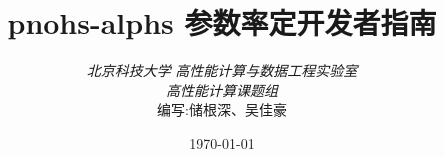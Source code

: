 \begin{titlepage}
    \title{pnohs-alphs 参数率定开发者指南}
    \author{
    \emph{北京科技大学} \emph{高性能计算与数据工程实验室} \\
    \emph{高性能计算课题组} \\[8cm]
    编写:储根深、吴佳豪
    }

    \date{\today}

    \maketitle
    \thispagestyle{empty}
\end{titlepage}